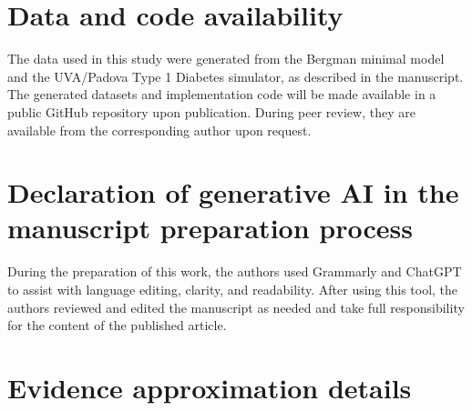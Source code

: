 \documentclass[preprint,12pt]{elsarticle}
\begin{document}
\section*{Data and code availability}
The data used in this study were generated from the Bergman minimal model and the UVA/Padova Type 1 Diabetes simulator, as described in the manuscript. The generated datasets and implementation code will be made available in a public GitHub repository upon publication. During peer review, they are available from the corresponding author upon request.

\section*{Declaration of generative AI in the manuscript preparation process}
During the preparation of this work, the authors used Grammarly and ChatGPT to assist with language editing, clarity, and readability. After using this tool, the authors reviewed and edited the manuscript as needed and take full responsibility for the content of the published article.



\appendix

\section{Evidence approximation details}
\label{app:evidence}
\end{document}
